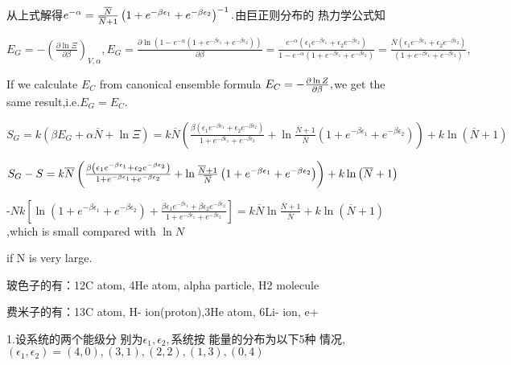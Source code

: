 \documentclass{ctexart}
\begin{document}
从上式解得$e^{-\alpha }=\frac{\overline{N}}{%
\overline{N}+1}\left( 1+e^{-\beta \epsilon _{1}}+e^{-\beta \epsilon
_{2}}\right) ^{-1}.$由巨正则分布的%
热力学公式知

$E_{G}=-\left( \frac{\partial \ln \Xi }{\partial \beta }\right) _{V,\alpha
},E_{G}=\frac{\partial \ln \left( 1-e^{-\alpha }\left( 1+e^{-\beta \epsilon
_{1}}+e^{-\beta \epsilon _{2}}\right) \right) }{\partial \beta }=\allowbreak 
\frac{e^{-\alpha }\left( \epsilon _{1}e^{-\beta \epsilon _{1}}+\epsilon
_{2}e^{-\beta \epsilon _{2}}\right) }{1-e^{-\alpha }\left( 1+e^{-\beta
\epsilon _{1}}+e^{-\beta \epsilon _{2}}\right) }\allowbreak \allowbreak =%
\frac{\overline{N}\left( \epsilon _{1}e^{-\beta \epsilon _{1}}+\epsilon
_{2}e^{-\beta \epsilon _{2}}\right) }{\left( 1+e^{-\beta \epsilon
_{1}}+e^{-\beta \epsilon _{2}}\right) },$

If we calculate $E_{C}$ from canonical ensemble formula $E_{C}=-\frac{%
\partial \ln Z}{\partial \beta },$we get the same result,i.e.$%
E_{G}\allowbreak =E_{C}.$

$S_{G}=k\left( \beta E_{G}+\alpha \overline{N}+\ln \Xi \right) =k\overline{N}%
\left( \frac{\beta \left( \epsilon _{1}e^{-\beta \epsilon _{1}}+\epsilon
_{2}e^{-\beta \epsilon _{2}}\right) }{1+e^{-\beta \epsilon _{1}}+e^{-\beta
\epsilon _{2}}}+\ln \frac{\overline{N}+1}{\overline{N}}\left( 1+e^{-\beta
\epsilon _{1}}+e^{-\beta \epsilon _{2}}\right) \right) +k\ln \left( 
\overline{N}+1\right) $

$S_{G}-S=k\overline{N}\left( \frac{\beta \left( \epsilon _{1}e^{-\beta
\epsilon _{1}}+\epsilon _{2}e^{-\beta \epsilon _{2}}\right) }{1+e^{-\beta
\epsilon _{1}}+e^{-\beta \epsilon _{2}}}+\ln \frac{\overline{N}+1}{\overline{%
N}}\left( 1+e^{-\beta \epsilon _{1}}+e^{-\beta \epsilon _{2}}\right) \right)
+k\ln \left( \overline{N}+1\right) $

-$Nk\left[ \ln \left( 1+e^{-\beta \epsilon _{1}}+e^{-\beta \epsilon
_{2}}\right) +\frac{\beta \epsilon _{1}e^{-\beta \epsilon _{1}}+\beta
\epsilon _{2}e^{-\beta \epsilon _{2}}}{1+e^{-\beta \epsilon _{1}}+e^{-\beta
\epsilon _{2}}}\right] =k\overline{N}\ln \frac{\overline{N}+1}{\overline{N}}%
+k\ln \left( \overline{N}+1\right) $,which is small compared with $\ln N$

if N is very large.


玻色子的有：12C atom, 4He atom, alpha
particle, H2 molecule

费米子的有：13C atom, H- ion(proton),3He
atom, 6Li- ion, e+


1.设系统的两个能级分%
别为$\epsilon _{1},\epsilon _{2},$系统按%
能量的分布为以下5种%
情况,$\left( \epsilon _{1},\epsilon _{2}\right) =\left(
4,0\right) ,\left( 3,1\right) ,\left( 2,2\right) ,\left( 1,3\right) ,\left(
0,4\right) $
\end{document}
